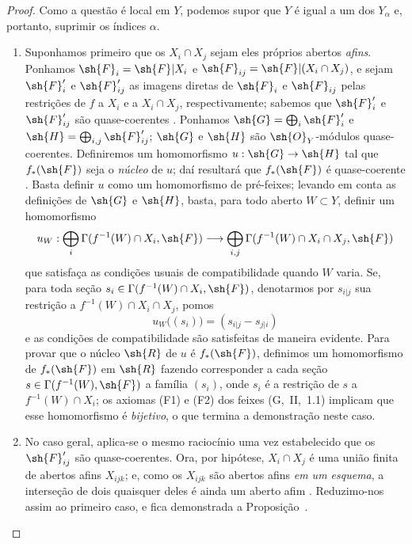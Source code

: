 \documentclass[oneside]{amsart}
\makeatletter
\newcommand{\ega@arrow}[2]{\mathchoice{#1}{#2}{#2}{#2}}
\renewcommand{\to}{\ega@arrow{\longrightarrow}{\rightarrow}}
\newcommand{\oldpage}[2][]{{\marginnote{\normalfont\textbf{#1}~|~#2}}\ignorespaces}
\makeatother
\begin{document}
\begin{proof}
Como a questão é local em $Y$, podemos supor que $Y$ é igual a um dos
$Y_\alpha$ e, portanto, suprimir os índices $\alpha$.
\begin{enumerate}
  \item[(a)] Suponhamos primeiro que os $X_i\cap X_j$ sejam eles próprios
    abertos \emph{afins}. Ponhamos $\sh{F}_i=\sh{F}|X_i$ e
    $\sh{F}_{ij}=\sh{F}|(X_i\cap X_j)$, e sejam $\sh{F}'_i$ e
    $\sh{F}'_{ij}$ as imagens diretas de $\sh{F}_i$ e
    $\sh{F}_{ij}$ pelas restrições de $f$ a $X_i$ e a
    $X_i\cap X_j$, respectivamente; sabemos que $\sh{F}'_i$ e
    $\sh{F}'_{ij}$ são quase-coerentes . Ponhamos
    $\sh{G}=\bigoplus_i\sh{F}'_i$ e
    $\sh{H}=\bigoplus_{i,j}\sh{F}'_{ij}$; $\sh{G}$ e $\sh{H}$ são
    $\sh{O}_Y$-módulos quase-coerentes. Definiremos um homomorfismo
    $u:\sh{G}\to\sh{H}$ tal que $f_*(\sh{F})$ seja o \emph{núcleo} de
    $u$; daí resultará que $f_*(\sh{F})$ é quase-coerente
    . Basta definir $u$
\oldpage[I]{172}
    como um homomorfismo de pré-feixes; levando em conta as definições
    de $\sh{G}$ e $\sh{H}$, basta, para todo aberto $W\subset Y$, definir
    um homomorfismo
    \[
      u_W:\bigoplus_i\Gamma(f^{-1}(W)\cap X_i,\sh{F})\to
      \bigoplus_{i,j}\Gamma(f^{-1}(W)\cap X_i\cap X_j,\sh{F})
    \]
    que satisfaça as condições usuais de compatibilidade quando $W$
    varia. Se, para toda seção
    $s_i\in\Gamma(f^{-1}(W)\cap X_i,\sh{F})$, denotarmos por $s_{i|j}$ sua
    restrição a $f^{-1}(W)\cap X_i\cap X_j$, pomos
    \[
      u_W\big((s_i)\big)=(s_{i|j}-s_{j|i})
    \]
    e as condições de compatibilidade são satisfeitas de maneira
    evidente. Para provar que o núcleo $\sh{R}$ de $u$ é
    $f_*(\sh{F})$, definimos um homomorfismo de $f_*(\sh{F})$ em
    $\sh{R}$ fazendo corresponder a cada seção
    $s\in\Gamma(f^{-1}(W),\sh{F})$ a família $(s_i)$, onde $s_i$ é a
    restrição de $s$ a $f^{-1}(W)\cap X_i$; os axiomas (F1) e (F2) dos
    feixes (G,~II,~1.1) implicam que esse homomorfismo é
    \emph{bijetivo}, o que termina a demonstração neste caso.
  \item[(b)] No caso geral, aplica-se o mesmo raciocínio uma vez
    estabelecido que os $\sh{F}'_{ij}$ são quase-coerentes. Ora, por
    hipótese, $X_i\cap X_j$ é uma união finita de abertos afins
    $X_{ijk}$; e, como os $X_{ijk}$ são abertos afins \emph{em um
    esquema}, a interseção de dois quaisquer deles é ainda um aberto
    afim . Reduzimo-nos assim ao primeiro caso, e fica
    demonstrada a Proposição~.
\end{enumerate}
\end{proof}
\end{document}
